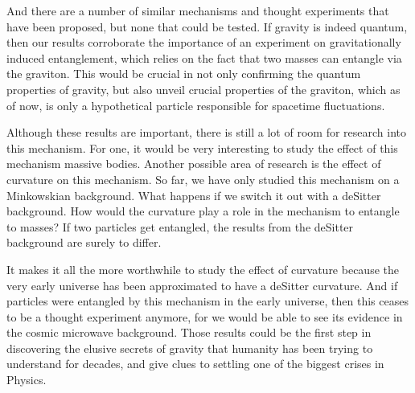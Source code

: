 \documentclass[12pt,a4paper]{report}
\theoremstyle{plain}
\theoremstyle{definition}
\theoremstyle{remark}
\begin{document}
And there are a number of similar mechanisms and thought experiments that have been proposed, but none that could be tested. If gravity is indeed quantum, then our results corroborate the importance of an experiment on gravitationally induced entanglement, which relies on the fact that two masses can entangle via the graviton. This would be crucial in not only confirming the quantum properties of gravity, but also unveil crucial properties of the graviton, which as of now, is only a hypothetical particle responsible for spacetime fluctuations.

Although these results are important, there is still a lot of room for research into this mechanism. For one, it would be very interesting to study the effect of this mechanism massive bodies. Another possible area of research is the effect of curvature on this mechanism. So far, we have only studied this mechanism on a Minkowskian background. What happens if we switch it out with a deSitter background. How would the curvature play a role in the mechanism to entangle to masses? If two particles get entangled, the results from the deSitter background are surely to differ. 

It makes it all the more worthwhile to study the effect of curvature because the very early universe has been approximated to have a deSitter curvature. And if particles were entangled by this mechanism in the early universe, then this ceases to be a thought experiment anymore, for we would be able to see its evidence in the cosmic microwave background. Those results could be the first step in discovering the elusive secrets of gravity that humanity has been trying to understand for decades, and give clues to settling one of the biggest crises in Physics.
\newpage

\newpage
\end{document}
